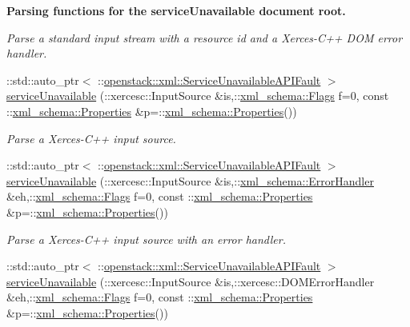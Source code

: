\begin{Indent}{\bf Parsing functions for the serviceUnavailable document root.}
\begin{DoxyCompactItemize}
\begin{DoxyCompactList}\small\item\em Parse a standard input stream with a resource id and a Xerces-\/C++ DOM error handler. \item\end{DoxyCompactList}\item 
::std::auto\_\-ptr$<$ ::\hyperlink{classopenstack_1_1xml_1_1ServiceUnavailableAPIFault}{openstack::xml::ServiceUnavailableAPIFault} $>$ \hyperlink{namespaceopenstack_1_1xml_ade1ad73f36e1ad3fb716048d05705196}{serviceUnavailable} (::xercesc::InputSource \&is,::\hyperlink{namespacexml__schema_affb4c227cbd9aa7453dd1dc5a1401943}{xml\_\-schema::Flags} f=0, const ::\hyperlink{namespacexml__schema_ad27ce19a7ee1d3b1064092648898f64c}{xml\_\-schema::Properties} \&p=::\hyperlink{namespacexml__schema_ad27ce19a7ee1d3b1064092648898f64c}{xml\_\-schema::Properties}())
\begin{DoxyCompactList}\small\item\em Parse a Xerces-\/C++ input source. \item\end{DoxyCompactList}\item 
::std::auto\_\-ptr$<$ ::\hyperlink{classopenstack_1_1xml_1_1ServiceUnavailableAPIFault}{openstack::xml::ServiceUnavailableAPIFault} $>$ \hyperlink{namespaceopenstack_1_1xml_aec3e1b8c2e69dff418941c181ce7b013}{serviceUnavailable} (::xercesc::InputSource \&is,::\hyperlink{namespacexml__schema_ab1c9361bfd3b404eaabf0c31eded79dc}{xml\_\-schema::ErrorHandler} \&eh,::\hyperlink{namespacexml__schema_affb4c227cbd9aa7453dd1dc5a1401943}{xml\_\-schema::Flags} f=0, const ::\hyperlink{namespacexml__schema_ad27ce19a7ee1d3b1064092648898f64c}{xml\_\-schema::Properties} \&p=::\hyperlink{namespacexml__schema_ad27ce19a7ee1d3b1064092648898f64c}{xml\_\-schema::Properties}())
\begin{DoxyCompactList}\small\item\em Parse a Xerces-\/C++ input source with an error handler. \item\end{DoxyCompactList}\item 
::std::auto\_\-ptr$<$ ::\hyperlink{classopenstack_1_1xml_1_1ServiceUnavailableAPIFault}{openstack::xml::ServiceUnavailableAPIFault} $>$ \hyperlink{namespaceopenstack_1_1xml_ad1740e71b3cb9f9d3b7f53a06f9b274a}{serviceUnavailable} (::xercesc::InputSource \&is,::xercesc::DOMErrorHandler \&eh,::\hyperlink{namespacexml__schema_affb4c227cbd9aa7453dd1dc5a1401943}{xml\_\-schema::Flags} f=0, const ::\hyperlink{namespacexml__schema_ad27ce19a7ee1d3b1064092648898f64c}{xml\_\-schema::Properties} \&p=::\hyperlink{namespacexml__schema_ad27ce19a7ee1d3b1064092648898f64c}{xml\_\-schema::Properties}())

\end{DoxyCompactItemize}
\end{Indent}
